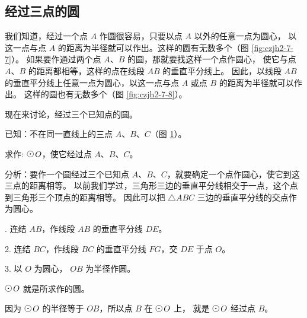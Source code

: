 \subsection{经过三点的圆}\label{subsec:czjh2-7-2}

我们知道，经过一个点 $A$ 作圆很容易，只要以点 $A$ 以外的任意一点为圆心，
以这一点与点 $A$ 的距离为半径就可以作出。这样的圆有无数多个（图 \ref{fig:czjh2-7-7}）。
如果要作通过两个点 $A$、$B$ 的圆，那就要找这样一个点作圆心，
使它与点 $A$、$B$ 的距离都相等，这样的点在线段 $AB$ 的垂直平分线上。
因此，以线段 $AB$ 的垂直平分线上任意一点为圆心，以这一点与点 $A$ 或点 $B$ 的距离为半径就可以作出。
这样的圆也有无数多个（图 \ref{fig:czjh2-7-8}）。


\begin{figure}[htbp]
    \centering
    \begin{minipage}[b]{4cm}
        \centering
        
        \caption{}\label{fig:czjh2-7-7}
    \end{minipage}
    \qquad
    \begin{minipage}[b]{6cm}
        \centering
        
        \caption{}\label{fig:czjh2-7-8}
    \end{minipage}
    \qquad
    \begin{minipage}[b]{4.5cm}
        \centering
        
        \caption{}\label{fig:czjh2-7-9}
    \end{minipage}
\end{figure}

现在来讨论，经过三个已知点的圆。


已知：不在同一直线上的三点 $A$、$B$、$C$（图 \ref{fig:czjh2-7-9}）。

求作: $\yuan \, O$，使它经过点 $A$、$B$、$C$。

分析：要作一个圆经过三个已知点 $A$、$B$、$C$，就要确定一个点作圆心，使它到这三点的距离相等。
以前我们学过，三角形三边的垂直平分线相交于一点，这个点到三角形三个顶点的距离相等。
因此可以把 $\triangle ABC$ 三边的垂直平分线的交点作为圆心。

. 连结 $AB$，作线段 $AB$ 的垂直平分线 $DE$。

2. 连结 $BC$，作线段 $BC$ 的垂直平分线 $FG$，交 $DE$ 于点 $O$。

3. 以 $O$ 为圆心， $OB$ 为半径作圆。

$\yuan\,O$ 就是所求作的圆。

\zhengming 因为 $\yuan\,O$ 的半径等于 $OB$，所以点 $B$ 在 $\yuan\,O$ 上， 就是 $\yuan\,O$ 经过点 $B$。

